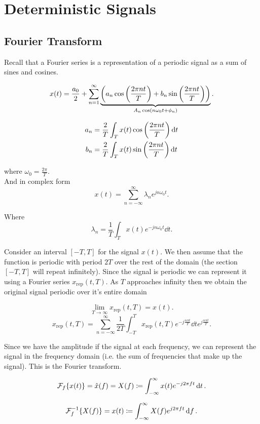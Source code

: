 \documentclass{report}
\newcommand{\Ft}[1]{\SF_f\!\lt\{ #1 \rt\}}
\newcommand{\Fti}[1]{\SF_f^{-1}\!\lt\{ #1 \rt\}}
\begin{document}
\chapter{Deterministic Signals}

\section{Fourier Transform}

Recall that a Fourier series is a representation of a periodic signal as a sum of sines and cosines.

\[
	x(t) = \frac{a_0}{2} + \sum_{n=1}^{\infty} \underbrace{\left( a_n\cos\left(\frac{2\pi nt}{T}\right) + b_n\sin\left(\frac{2\pi nt}{T}\right) \right)}_{
		A_n\cos\left(n\omega_0t + \phi_n\right)
	}
	.\]

\begin{align*}
	a_n & = \frac{2}{T}\int_{T} x(t)\cos\left(\frac{2\pi nt}{T}\right) \dd{t} \\
	b_n & = \frac{2}{T}\int_{T} x(t)\sin\left(\frac{2\pi nt}{T}\right) \dd{t}
\end{align*}

where $\omega_0 = \frac{2\pi}{T}$.\\

And in complex form
\[
	x(t) = \sum_{n=-\infty}^{\infty} \lambda_n e^{jn\omega_0t}
	.\]

Where
\[
	\lambda_n = \frac{1}{T}\int_{T} x(t)e^{-jn\omega_0t} \dd{t}
	.\]

Consider an interval $[-T,T]$ for the signal $x(t)$. We then assume that the function is periodic with period $2T$ over the rest of the domain (the section $[-T,T]$ will repeat infinitely). Since the signal is periodic we can represent it using a Fourier series $x_\text{rep}(t,T)$.
As $T$ approaches infinity then we obtain the original signal periodic over it's entire domain

\[
	\lim_{T\to\infty} x_\text{rep}(t,T) = x(t)
	.\]
\[
	x_\text{rep}(t,T) = \sum_{n=-\infty}^{\infty} \frac{1}{2T} \int_{-T}^{T} x_\text{rep}(t,T)e^{-j\frac{n\pi t}{T}} \dd{t} e^{j\frac{n\pi t}{T}}
	.\]

Since we have the amplitude if the signal at each frequency, we can represent the signal in the frequency domain (i.e. the sum of frequencies that make up the signal). This is the Fourier transform.

\[
	\Ft{x(t)} = \hat{x}(f) = X(f) \coloneq \int_{-\infty}^{\infty} x(t)e^{-j2\pi ft} \dd{t}
	.\]

\[
	\Fti{X(f)} = x(t) \coloneq \int_{-\infty}^{\infty} X(f)e^{j2\pi ft} \dd{f}
	.\]
\end{document}
